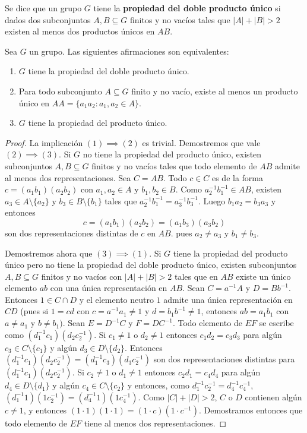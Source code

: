 \begin{definition}
	Se dice que un grupo $G$ tiene la \textbf{propiedad del doble producto
	único} si dados dos subconjuntos $A,B\subseteq G$ finitos y no vacíos tales
	que $|A|+|B|>2$ existen al menos dos productos únicos en $AB$.
\end{definition}

\begin{theorem}[Strojnowski]
	\label{theorem:Strojnowski}
	Sea $G$ un grupo. Las siguientes afirmaciones son equivalentes:
	\begin{enumerate}
		\item $G$ tiene la propiedad del doble producto único.
		\item Para todo subconjunto $A\subseteq G$ finito y no vacío, existe al
			menos un producto único en $AA=\{a_1a_2:a_1,a_2\in A\}$.
		\item $G$ tiene la propiedad del producto único.
	\end{enumerate}
\end{theorem}

\begin{proof}
	La implicación $(1)\implies(2)$ es trivial.  Demostremos que vale
	$(2)\implies(3)$. Si $G$ no tiene la propiedad del producto único, existen
	subconjuntos $A,B\subseteq G$ finitos y no vacíos tales que todo elemento
	de $AB$ admite al menos dos representaciones. Sea $C=AB$. Todo $c\in C$ es
	de la forma $c=(a_1b_1)(a_2b_2)$ con $a_1,a_2\in A$ y $b_1,b_2\in B$. Como
	$a_2^{-1}b_1^{-1}\in AB$, existen $a_3\in A\setminus\{a_2\}$ y $b_3\in B\setminus\{b_1\}$ tales que
	$a_2^{-1}b_1^{-1}=a_3^{-1}b_3^{-1}$. Luego $b_1a_2=b_3a_3$ y entonces
	\[
	c=(a_1b_1)(a_2b_2)=(a_1b_3)(a_3b_2)
	\]
	son dos representaciones distintas de $c$ en $AB$.
	pues $a_2\ne a_3$ y $b_1\ne b_3$.

	Demostremos ahora que $(3)\implies(1)$. Si $G$ tiene la propiedad del
	producto único pero no tiene la propiedad del doble producto único, existen
	subconjuntos $A,B\subseteq G$ finitos y no vacíos con $|A|+|B|>2$ tales que
	en $AB$ existe un único elemento $ab$ con una única representación en $AB$.
	Sean $C=a^{-1}A$ y $D=Bb^{-1}$. Entonces $1\in C\cap D$ y el elemento
	neutro $1$ admite una única representación en $CD$ (pues si $1=cd$ con
	$c=a^{-1}a_1\ne 1$ y $d=b_1b^{-1}\ne 1$, entonces $ab=a_1b_1$ con $a\ne
	a_1$ y $b\ne b_1)$. Sean $E=D^{-1}C$ y $F=DC^{-1}$. Todo elemento de $EF$
	se escribe como $(d_1^{-1}c_1)(d_2c_2^{-1})$. Si $c_1\ne 1$ o $d_2\ne 1$
	entonces $c_1d_2=c_3d_3$ para algún $c_3\in C\setminus\{c_1\}$ y algún
	$d_3\in D\setminus\{d_2\}$. Entonces
	$(d_1^{-1}c_1)(d_2c_2^{-1})=(d_1^{-1}c_3)(d_3c_2^{-1})$ son dos
	representaciones distintas para $(d_1^{-1}c_1)(d_2c_2^{-1})$. Si $c_2\ne 1$
	o $d_1\ne 1$ entonces $c_2d_1=c_4d_4$ para algún $d_4\in D\setminus\{d_1\}$
	y algún $c_4\in C\setminus\{c_2\}$ y entonces, como
	$d_1^{-1}c_2^{-1}=d_4^{-1}c_4^{-1}$,
	$(d_1^{-1}1)(1c_2^{-1})=(d_4^{-1}1)(1c_4^{-1})$.  Como $|C|+|D|>2$, $C$ o
	$D$ contienen algún $c\ne1$, y entonces $(1\cdot 1)(1\cdot 1)=(1\cdot
	c)(1\cdot c^{-1})$. Demostramos entonces que todo elemento de $EF$ tiene al
	menos dos representaciones. 
\end{proof}

